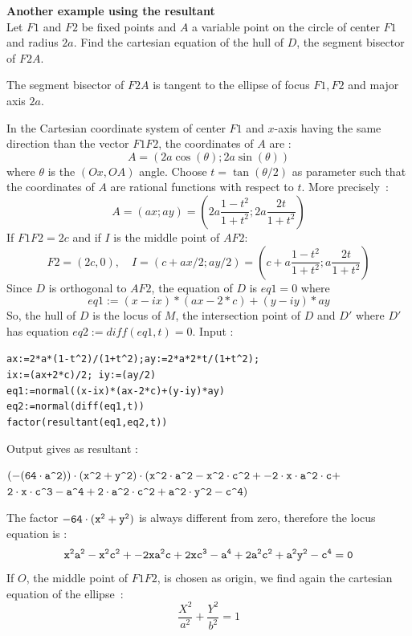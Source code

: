 \documentclass[a4paper,11pt]{book}
\begin{document}
{\bf Another example using the resultant}\\
Let $F1$ and $F2$ be fixed points and $A$ a variable point on the 
circle of center $F1$ and radius $2a$.
Find the cartesian equation of the hull of $D$, the segment bisector 
of $F2A$.

The segment bisector of $F2A$ is tangent to the ellipse of focus  
$F1,F2$ and major axis $2a$.

In the Cartesian coordinate system of center $F1$ and $x$-axis having the same 
direction than the vector $F1F2$, the coordinates of $A$ are :
\[ A= (2a\cos(\theta);2a\sin(\theta)) \]
where $\theta$ is the $(Ox,OA)$ angle.
Choose $t=\tan(\theta/2)$ as parameter such that the coordinates of $A$ are
rational functions with respect to $t$.
More precisely~:
\[ A=(ax;ay)=(2a\frac{1-t^2}{1+t^2};2a\frac{2t}{1+t^2}) \]
If $F1F2=2c$ and if $I$ is the middle point of $AF2$:\\
\[ F2=(2c,0), \quad
I=(c+ax/2;ay/2)=(c+a\frac{1-t^2}{1+t^2};a\frac{2t}{1+t^2}) 
\]
Since $D$ is orthogonal to $AF2$, the equation of $D$ is
$eq1=0$ where
\[ eq1:=(x-ix)*(ax-2*c)+(y-iy)*ay \]
So, the hull of $D$ is the locus of $M$, the intersection point of $D$ 
and $D'$ where $D'$ has equation $eq2:=diff(eq1,t)=0$.
Input :
\begin{center}
{\tt ax:=2*a*(1-t\verb|^|2)/(1+t\verb|^|2);ay:=2*a*2*t/(1+t\verb|^|2);}\\
{\tt ix:=(ax+2*c)/2; iy:=(ay/2)}\\
{\tt eq1:=normal((x-ix)*(ax-2*c)+(y-iy)*ay)}\\
{\tt eq2:=normal(diff(eq1,t))}\\
{\tt factor(resultant(eq1,eq2,t))}
\end{center}
Output gives as resultant :
\begin{center}
${\tt (-(64\cdot a\verb|^|2))\cdot(x\verb|^|2+y\verb|^|2)\cdot(x\verb|^|2\cdot a\verb|^|2-x\verb|^|2\cdot c\verb|^|2+-2\cdot x\cdot a\verb|^|2\cdot c+}$\\
${\tt 2\cdot x\cdot c\verb|^|3-a\verb|^|4+2\cdot a\verb|^|2\cdot c\verb|^|2+a\verb|^|2\cdot y\verb|^|2-c\verb|^|4)}$\\
\end{center}
The factor ${\tt -64\cdot (x^2+y^2)}$ is always different from zero, 
therefore the locus equation is :
\[ {\tt x^2a^2-x^2c^2+-2xa^2c+2xc^3-a^4+2a^2c^2+a^2y^2-c^4=0} \]
If $O$, the middle point of $F1F2$, is chosen as origin,
we find again the cartesian equation of the ellipse~:
\[ \frac{X^2}{a^2}+\frac{Y^2}{b^2}=1 \]
\end{document}
